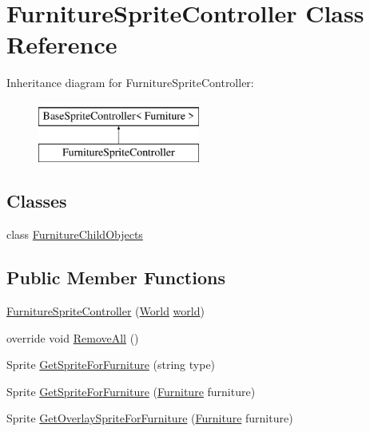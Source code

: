 \hypertarget{class_furniture_sprite_controller}{}\section{Furniture\+Sprite\+Controller Class Reference}
\label{class_furniture_sprite_controller}
Inheritance diagram for Furniture\+Sprite\+Controller\+:\begin{figure}[H]
\begin{center}
\leavevmode
\includegraphics[height=2.000000cm]{class_furniture_sprite_controller}
\end{center}
\end{figure}
\subsection*{Classes}
\begin{DoxyCompactItemize}
\item 
class \hyperlink{class_furniture_sprite_controller_1_1_furniture_child_objects}{Furniture\+Child\+Objects}
\end{DoxyCompactItemize}
\subsection*{Public Member Functions}
\begin{DoxyCompactItemize}
\item 
\hyperlink{class_furniture_sprite_controller_ac5618a43ab627524a3f8dc8ca6516c27}{Furniture\+Sprite\+Controller} (\hyperlink{class_world}{World} \hyperlink{class_base_sprite_controller_a593ea6a31165eff51a0acffc12ea65ca}{world})
\item 
override void \hyperlink{class_furniture_sprite_controller_aaa9325a8a0357fe3b64709ea437a3dce}{Remove\+All} ()
\item 
Sprite \hyperlink{class_furniture_sprite_controller_a28c4198ec62f455ece7489a0c40b9cc9}{Get\+Sprite\+For\+Furniture} (string type)
\item 
Sprite \hyperlink{class_furniture_sprite_controller_a201db1fdfd15912cf33fea9fab45b034}{Get\+Sprite\+For\+Furniture} (\hyperlink{class_furniture}{Furniture} furniture)
\item 
Sprite \hyperlink{class_furniture_sprite_controller_ac9a9b01afdd77238e8dcab98d2b7d877}{Get\+Overlay\+Sprite\+For\+Furniture} (\hyperlink{class_furniture}{Furniture} furniture)
\end{DoxyCompactItemize}
